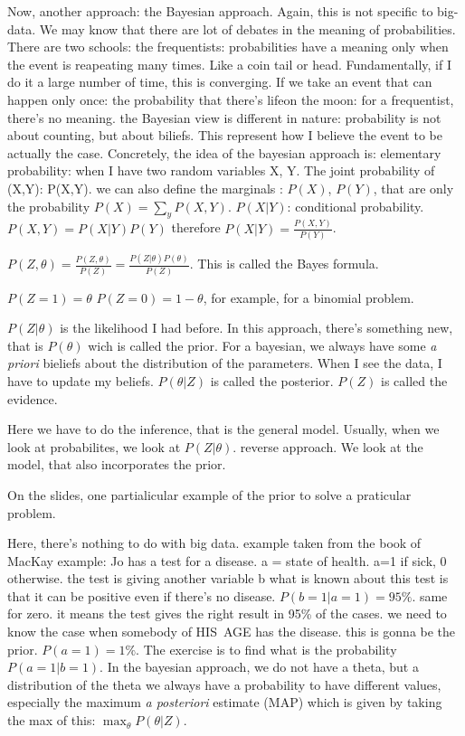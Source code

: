 \documentclass[a4paper]{tufte-book}
\begin{document}
Now, another approach: the Bayesian approach. Again, this is not specific to big-data.
We may know that there are lot of debates in the meaning of probabilities. There
are two schools: the frequentists: probabilities have a meaning only when the
event is reapeating many times. Like a coin tail or head. Fundamentally, if I do
it a large number of time, this is converging.
If we take an event that can happen only once: the probability that there's lifeon the moon: for a frequentist, there's no meaning.
the Bayesian view is different in nature: probability is not about counting, but
about biliefs. This represent how I believe the event to be actually the case.
Concretely, the idea of the bayesian approach is:
elementary probability: when I have two random variables X, Y.
The joint probability of (X,Y): P(X,Y). we can also define the marginals :
$P(X)$, $P(Y)$, that are only the probability $P(X) = \sum_y P(X,Y)$.
$P(X|Y)$: conditional probability.
$P(X,Y) = P(X|Y)P(Y)$
therefore $P(X|Y) = \frac{P(X,Y)}{P(Y)}$.


$P(Z,\theta) = \frac{P(Z,\theta)}{P(Z)} = \frac{P(Z|\theta)P(\theta)}{P(Z)}$.
This is called the Bayes formula.

$P(Z=1) = \theta$
$P(Z=0) = 1-\theta$, for example, for a binomial problem.

$P(Z|\theta)$ is the likelihood I had before.
In this approach, there's something new, that is $P(\theta)$ wich is called the prior.
For a bayesian, we always have some \emph{a priori} bieliefs about the
distribution of the parameters. When I see the data, I have to update my
beliefs.
$P(\theta|Z)$ is called the posterior.
$P(Z)$ is called the evidence.

Here we have to do the inference, that is the general model. Usually, when we
look at probabilites, we look at $P(Z|\theta)$. reverse approach.
We look at  the model, that also incorporates the prior.

On the slides, one partialicular example of the prior to solve a praticular problem.


Here, there's nothing to do with big data. example taken from the book of MacKay
example: Jo has a test for a disease. a = state of health.
a=1 if sick, 0 otherwise.
the test is giving another variable b
what is known about this test is that it can be positive even if there's no
disease. $P(b=1|a=1) = 95\%$. same for zero.
it means the test gives the right result in 95\% of the cases.
we need to know the case when somebody of HIS AGE has the disease. this
is gonna be the prior. $P(a=1) = 1\%$.
The exercise is to find what is the probability $P(a=1|b=1)$.
In the bayesian approach, we do not have a theta, but a distribution of the theta
we always have a probability to have different values, especially the maximum
\emph{a posteriori} estimate (MAP)
which is given by taking the max of this:
$\max_\theta P(\theta|Z)$.
\end{document}

